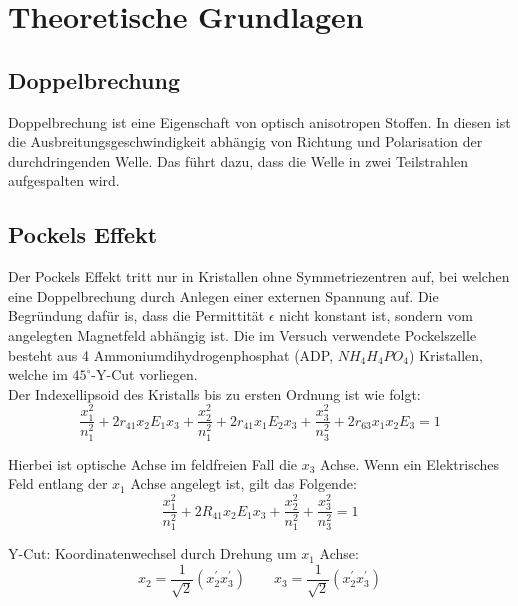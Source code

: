 \section{Theoretische Grundlagen}
\subsection{Doppelbrechung}
Doppelbrechung ist eine Eigenschaft von optisch anisotropen Stoffen. In diesen ist die Ausbreitungsgeschwindigkeit abhängig von Richtung und Polarisation der durchdringenden Welle. Das führt dazu, dass die Welle in zwei Teilstrahlen aufgespalten wird.


\subsection{Pockels Effekt}
Der Pockels Effekt tritt nur in Kristallen ohne Symmetriezentren auf, bei welchen eine Doppelbrechung durch Anlegen einer externen Spannung auf. Die Begründung dafür is, dass die Permittität $\epsilon$ nicht konstant ist, sondern vom angelegten Magnetfeld abhängig ist. 
Die im Versuch verwendete Pockelszelle besteht aus 4 Ammoniumdihydrogenphosphat (ADP, $NH_4H_4PO_4$) Kristallen, welche im $45^\circ$-Y-Cut vorliegen.\\
Der Indexellipsoid  des Kristalls bis zu ersten Ordnung ist wie folgt:
\begin{equation}
	\frac{x_1^2}{n_1^2} + 2 r_{41} x_2 E_1 x_3 + \frac{x_2^2}{n_1^2}+ 2 r_{41} x_1 E_2 x_3 + \frac{x_3^2}{n_3^2} +  2 r_{63} x_1 x_2 E_3 = 1
\end{equation}

Hierbei ist optische Achse im feldfreien Fall die $x_3$ Achse. 	Wenn ein Elektrisches Feld entlang der $x_1$ Achse angelegt ist, gilt das Folgende:
\begin{equation}
		\frac{x_1^2}{n_1^2} + 2 R_{41} x_2 E_1 x_3 + \frac{x_2^2}{n_1^2}+  \frac{x_3^2}{n_3^2} = 1
\end{equation}

Y-Cut: Koordinatenwechsel durch Drehung um $x_1$ Achse:
\begin{equation}
	x_2 = \frac{1}{\sqrt{2}} \left(x_2^\prime x_3^\prime \right) \qquad
	x_3 = \frac{1}{\sqrt{2}} \left(x_2^\prime x_3^\prime \right) 
\end{equation}

